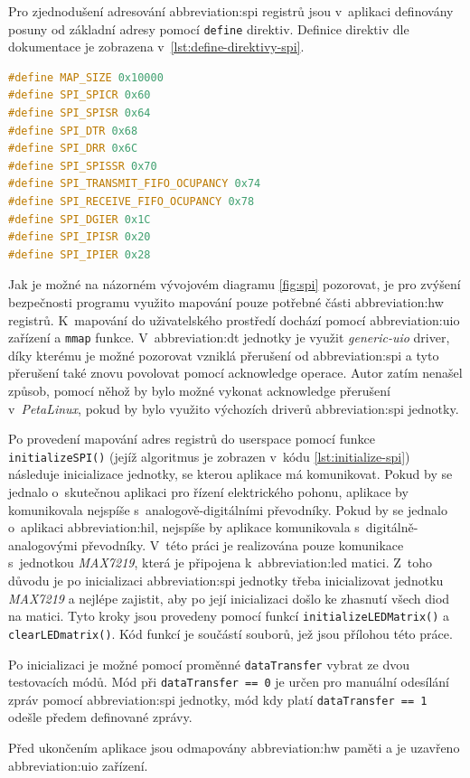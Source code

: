 \documentclass[a4paper, twoside, 11pt]{article}
\newcommand{\fbar}{\FloatBarrier}
\begin{document}
	Pro zjednodušení adresování \gls{abbreviation:spi} registrů jsou v~aplikaci definovány posuny od základní adresy pomocí \texttt{define} direktiv. Definice direktiv dle dokumentace \cite{axi-quad-spi-ip-product-guide} je zobrazena v~\ref{lst:define-direktivy-spi}.\par

	\fbar
	\begin{lstlisting}[language={c++}, caption={Definice posuvu adres pro registry \gls{abbreviation:axi} Quad \gls{abbreviation:spi} bloku pomocí define direktiv.}, label={lst:define-direktivy-spi}]
#define MAP_SIZE 0x10000
#define SPI_SPICR 0x60
#define SPI_SPISR 0x64
#define SPI_DTR 0x68
#define SPI_DRR 0x6C
#define SPI_SPISSR 0x70
#define SPI_TRANSMIT_FIFO_OCUPANCY 0x74
#define SPI_RECEIVE_FIFO_OCUPANCY 0x78
#define SPI_DGIER 0x1C
#define SPI_IPISR 0x20
#define SPI_IPIER 0x28\end{lstlisting}

	Jak je možné na názorném vývojovém diagramu \ref{fig:spi} pozorovat, je pro zvýšení bezpečnosti programu využito mapování pouze potřebné části \gls{abbreviation:hw} registrů. K~mapování do uživatelského prostředí dochází pomocí \gls{abbreviation:uio} zařízení a \texttt{mmap} funkce. V~\gls{abbreviation:dt} jednotky je využit \textit{generic-uio} driver, díky kterému je možné pozorovat vzniklá přerušení od \gls{abbreviation:spi} a tyto přerušení také znovu povolovat pomocí acknowledge operace. Autor zatím nenašel způsob, pomocí něhož by bylo možné vykonat acknowledge přerušení v~\textit{PetaLinux}, pokud by bylo využito výchozích driverů \gls{abbreviation:spi} jednotky.\par
	Po provedení mapování adres registrů do userspace pomocí funkce \texttt{initializeSPI()} (jejíž algoritmus je zobrazen v~kódu \ref{lst:initialize-spi}) následuje inicializace jednotky, se kterou aplikace má komunikovat. Pokud by se jednalo o~skutečnou aplikaci pro řízení elektrického pohonu, aplikace by komunikovala nejspíše s~analogově-digitálními převodníky. Pokud by se jednalo o~aplikaci \gls{abbreviation:hil}, nejspíše by aplikace komunikovala s~digitálně-analogovými převodníky. V~této práci je realizována pouze komunikace s~jednotkou \textit{MAX7219}, která je připojena k~\gls{abbreviation:led} matici. Z~toho důvodu je po inicializaci \gls{abbreviation:spi} jednotky třeba inicializovat jednotku \textit{MAX7219} a nejlépe zajistit, aby po její inicializaci došlo ke zhasnutí všech diod na matici. Tyto kroky jsou provedeny pomocí funkcí \texttt{initializeLEDMatrix()} a \texttt{clearLEDmatrix()}. Kód funkcí je součástí souborů, jež jsou přílohou této práce.\par
	Po inicializaci je možné pomocí proměnné \texttt{dataTransfer} vybrat ze dvou testovacích módů. Mód při \texttt{dataTransfer == 0} je určen pro manuální odesílání zpráv pomocí \gls{abbreviation:spi} jednotky, mód kdy platí \texttt{dataTransfer == 1} odešle předem definované zprávy.\par
	Před ukončením aplikace jsou odmapovány \gls{abbreviation:hw} paměti a je uzavřeno \gls{abbreviation:uio} zařízení.
\end{document}
